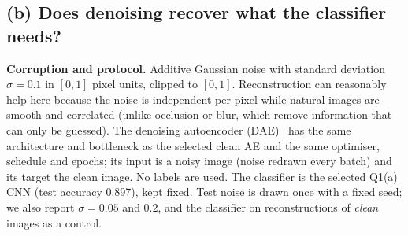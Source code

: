 \subsection{(b) Does denoising recover what the classifier needs?}
\textbf{Corruption and protocol.} Additive Gaussian noise with standard deviation $\sigma=0.1$ in $[0,1]$ pixel
units, clipped to $[0,1]$. Reconstruction can reasonably help here because the noise is independent per pixel
while natural images are smooth and correlated (unlike occlusion or blur, which remove information that can only
be guessed). The denoising autoencoder (DAE)~\cite{vincent2008extracting} has the same architecture and
bottleneck as the selected clean AE and the same optimiser, schedule and epochs; its input is a noisy image
(noise redrawn every batch) and its target the clean image. No labels are used. The classifier is the selected
Q1(a) CNN (test accuracy 0.897), kept fixed. Test noise is drawn once with a fixed seed; we also report
$\sigma=0.05$ and $0.2$, and the classifier on reconstructions of \emph{clean} images as a control.

\begin{table}[t]
\centering
\small
{}
\caption{Q3(b). Test accuracy of the fixed Q1(a) CNN.}
\label{tab:q3b}
\end{table}


